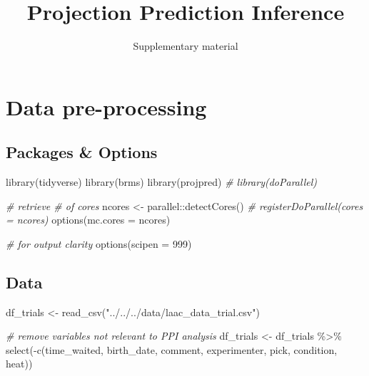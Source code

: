 \documentclass[
]{article}
\title{Projection Prediction Inference}
\subtitle{Supplementary material}
\author{}
\date{\vspace{-2.5em}}
\newenvironment{Shaded}{\begin{snugshade}}{\end{snugshade}}
\newcommand{\AttributeTok}[1]{\textcolor[rgb]{0.77,0.63,0.00}{#1}}
\newcommand{\CommentTok}[1]{\textcolor[rgb]{0.56,0.35,0.01}{\textit{#1}}}
\newcommand{\DecValTok}[1]{\textcolor[rgb]{0.00,0.00,0.81}{#1}}
\newcommand{\FunctionTok}[1]{\textcolor[rgb]{0.00,0.00,0.00}{#1}}
\newcommand{\NormalTok}[1]{#1}
\newcommand{\OtherTok}[1]{\textcolor[rgb]{0.56,0.35,0.01}{#1}}
\newcommand{\SpecialCharTok}[1]{\textcolor[rgb]{0.00,0.00,0.00}{#1}}
\newcommand{\StringTok}[1]{\textcolor[rgb]{0.31,0.60,0.02}{#1}}
\begin{document}
\maketitle

{
\setcounter{tocdepth}{2}
\tableofcontents
}
\hypertarget{data-pre-processing}{%
\section{Data pre-processing}\label{data-pre-processing}}

\hypertarget{packages-options}{%
\subsection{Packages \& Options}\label{packages-options}}

\begin{Shaded}
\begin{Highlighting}[]
\FunctionTok{library}\NormalTok{(tidyverse)}
\FunctionTok{library}\NormalTok{(brms)}
\FunctionTok{library}\NormalTok{(projpred)}
\CommentTok{\# library(doParallel)}

\CommentTok{\# retrieve \# of cores}
\NormalTok{ncores }\OtherTok{\textless{}{-}}\NormalTok{ parallel}\SpecialCharTok{::}\FunctionTok{detectCores}\NormalTok{()}
\CommentTok{\# registerDoParallel(cores = ncores)}
\FunctionTok{options}\NormalTok{(}\AttributeTok{mc.cores =}\NormalTok{ ncores)}

\CommentTok{\# for output clarity}
\FunctionTok{options}\NormalTok{(}\AttributeTok{scipen =} \DecValTok{999}\NormalTok{)}
\end{Highlighting}
\end{Shaded}

\hypertarget{data}{%
\subsection{Data}\label{data}}

\begin{Shaded}
\begin{Highlighting}[]
\NormalTok{df\_trials }\OtherTok{\textless{}{-}} \FunctionTok{read\_csv}\NormalTok{(}\StringTok{"../../../data/laac\_data\_trial.csv"}\NormalTok{)}
\end{Highlighting}
\end{Shaded}

\begin{Shaded}
\begin{Highlighting}[]
\CommentTok{\# remove variables not relevant to PPI analysis}
\NormalTok{df\_trials }\OtherTok{\textless{}{-}}\NormalTok{ df\_trials }\SpecialCharTok{\%\textgreater{}\%} 
  \FunctionTok{select}\NormalTok{(}\SpecialCharTok{{-}}\FunctionTok{c}\NormalTok{(time\_waited, birth\_date, comment, experimenter, pick, condition, heat))}
\end{Highlighting}
\end{Shaded}
\end{document}
